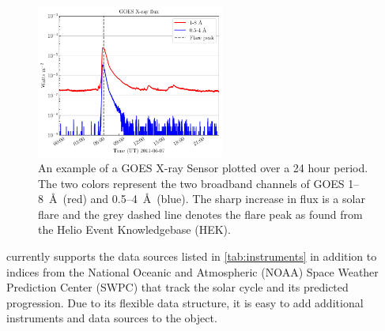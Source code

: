\begin{figure}
    \centering
    \includegraphics[width=0.55\textwidth]{figures/timeseries_example.pdf}
    \caption{An example of a GOES X-ray Sensor \Timeseries plotted over a 24 hour period. The two colors represent the two broadband channels of GOES 1--8~\AA\ (red) and 0.5--4~\AA\ (blue).  The sharp increase in flux is a solar flare and the grey dashed line denotes the flare peak as found from the Helio Event Knowledgebase (HEK).}
    \label{fig:timeseries_example}
\end{figure}

\Timeseries currently supports the data sources listed in \autoref{tab:instruments} in addition to indices from the National Oceanic and Atmospheric (NOAA) Space Weather Prediction Center (SWPC) that track the solar cycle and its predicted progression. Due to its flexible data structure, it is easy to add additional instruments and data sources to the \Timeseries object.

